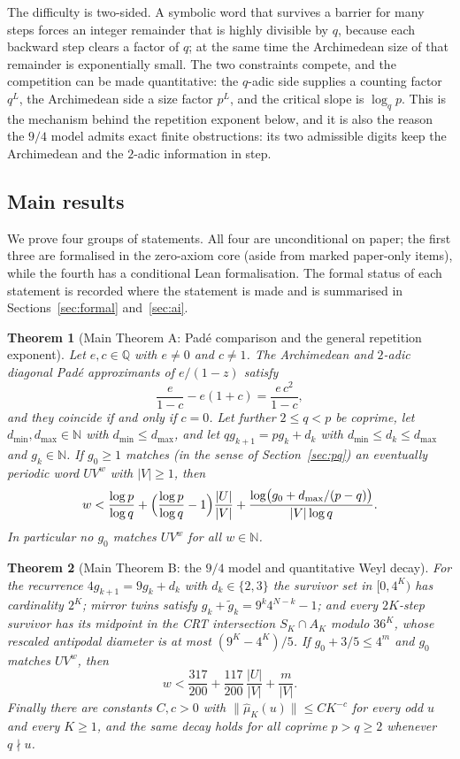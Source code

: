\documentclass[11pt,a4paper]{article}
\newtheorem{theorem}{Theorem}[section]
\theoremstyle{remark}
\newcommand{\Q}{\mathbb{Q}}
\newcommand{\N}{\mathbb{N}}
\begin{document}
The difficulty is two-sided. A symbolic word that survives a barrier for many steps forces an integer remainder that is highly divisible by $q$, because each backward step clears a factor of $q$; at the same time the Archimedean size of that remainder is exponentially small. The two constraints compete, and the competition can be made quantitative: the $q$-adic side supplies a counting factor $q^{L}$, the Archimedean side a size factor $p^{L}$, and the critical slope is $\log_{q} p$. This is the mechanism behind the repetition exponent below, and it is also the reason the $9/4$ model admits exact finite obstructions: its two admissible digits keep the Archimedean and the $2$-adic information in step.

\subsection{Main results}

We prove four groups of statements. All four are unconditional on paper; the first three are formalised in the zero-axiom core (aside from marked paper-only items), while the fourth has a conditional Lean formalisation. The formal status of each statement is recorded where the statement is made and is summarised in Sections~\ref{sec:formal} and~\ref{sec:ai}.

\begin{theorem}[Main Theorem A: Pad\'e comparison and the general repetition exponent]
\label{thm:mainA}
Let $e, c \in \Q$ with $e \neq 0$ and $c \neq 1$. The Archimedean and $2$-adic diagonal Pad\'e approximants of $e/(1-z)$ satisfy
\[
  \frac{e}{1-c} - e(1+c) = \frac{e\,c^{2}}{1-c},
\]
and they coincide if and only if $c = 0$. Let further $2 \le q < p$ be coprime, let $d_{\min}, d_{\max} \in \N$ with $d_{\min} \le d_{\max}$, and let $q g_{k+1} = p g_{k} + d_{k}$ with $d_{\min} \le d_{k} \le d_{\max}$ and $g_{k} \in \N$. If $g_{0} \ge 1$ matches (in the sense of Section~\ref{sec:pq}) an eventually periodic word $U V^{w}$ with $|V| \ge 1$, then
\[
  w < \frac{\log p}{\log q} + \Bigl(\frac{\log p}{\log q} - 1\Bigr)\frac{|U|}{|V|}
      + \frac{\log\bigl(g_{0} + d_{\max}/(p-q)\bigr)}{|V| \log q}.
\]
In particular no $g_{0}$ matches $U V^{w}$ for all $w \in \N$.
\end{theorem}

\begin{theorem}[Main Theorem B: the $9/4$ model and quantitative Weyl decay]
\label{thm:mainB}
For the recurrence $4 g_{k+1} = 9 g_{k} + d_{k}$ with $d_{k} \in \{2,3\}$ the survivor set in $[0,4^{K})$ has cardinality $2^{K}$; mirror twins satisfy $g_{k} + \tilde g_{k} = 9^{k} 4^{N-k} - 1$; and every $2K$-step survivor has its midpoint in the CRT intersection $S_{K} \cap A_{K}$ modulo $36^{K}$, whose rescaled antipodal diameter is at most $(9^{K} - 4^{K})/5$. If $g_{0} + 3/5 \le 4^{m}$ and $g_{0}$ matches $U V^{w}$, then
\[
  w < \frac{317}{200} + \frac{117}{200}\,\frac{|U|}{|V|} + \frac{m}{|V|}.
\]
Finally there are constants $C, c > 0$ with $\|\hat\mu_{K}(u)\| \le C K^{-c}$ for every odd $u$ and every $K \ge 1$, and the same decay holds for all coprime $p > q \ge 2$ whenever $q \nmid u$.
\end{theorem}
\end{document}

